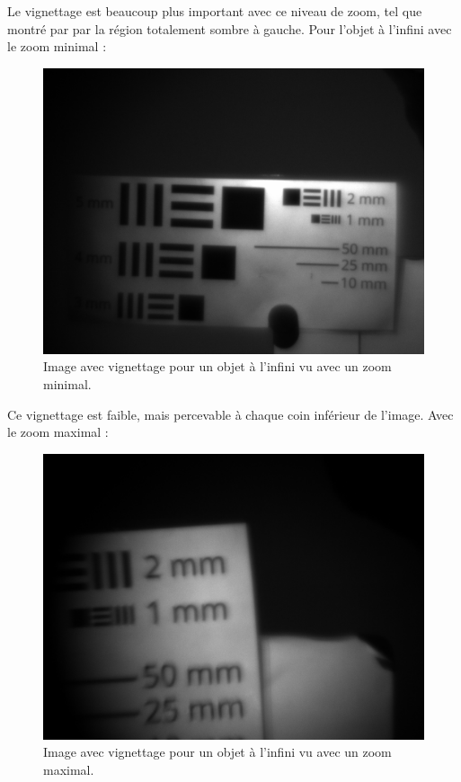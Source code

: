 \documentclass[11pt,letterpaper]{article}
\begin{document}
Le vignettage est beaucoup plus important avec ce niveau de zoom, tel que montré par
par la région totalement sombre à gauche. Pour l'objet à l'infini avec le zoom minimal :

\begin{figure}[H]
  \centering
  \includegraphics[scale=0.3]{vig_inf_min.png}
  \caption{Image avec vignettage pour un objet à l'infini vu avec un zoom minimal.}
  \label{vig_inf_min}
\end{figure}

Ce vignettage est faible, mais percevable à chaque coin inférieur de l'image. Avec
le zoom maximal :

\begin{figure}[H]
  \centering
  \includegraphics[scale=0.3]{vig_inf_max.png}
  \caption{Image avec vignettage pour un objet à l'infini vu avec un zoom maximal.}
  \label{vig_inf_max}
\end{figure}
\end{document}
